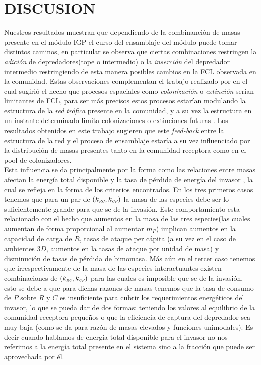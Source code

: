 \section{DISCUSION}

Nuestros resultados muestran que dependiendo de la combinanci\'on de masas presente en el m\'odulo IGP el curso del ensamblaje del m\'odulo puede tomar distintos caminos, en particular se observa que ciertas combinaciones restringen la \emph{adici\'on} de depredadores(tope o intermedio) o la \emph{inserci\'on} del depredador intermedio restringiendo de esta manera posibles cambios en la FCL observada en la comunidad\citep{TP2007proximate}. Estas observaciones complementan el trabajo realizado por \citet{holt2002food} en el cual sugiri\'o el hecho que procesos espaciales como \emph{colonizaci\'on} o \emph{extinci\'on} ser\'ian limitantes de FCL, para ser m\'as precisos estos procesos estar\'ian modulando la estructura de la \emph{red tr\'ofica} presente en la comunidad, y a su vez la estructura en un instante determinado limita colonizaciones o extinciones futuras \citep{pawar2009community,holt2002food}.  Los resultados obtenidos en este trabajo sugieren que este \emph{feed-back} entre la estructura de la red y el proceso de ensamblaje estar\'ia a su vez influenciado por la distribuci\'on de masas presentes tanto en la comunidad receptora como en el pool de colonizadores.\\

Esta influencia se da principalmente por la forma como las relaciones entre masas afectan la energ\'ia total disponible y la tasa de p\'erdida de energ\'ia del invasor \citep{pawar2012dimensionality}, la cual se refleja en la forma de los criterios encontrados. En los tres primeros casos tenemos que para un par de $(k_{\textit{\tiny RC}},k_{\textit{\tiny CP}})$ la masa de las especies debe ser lo suficientemente grande para que se de la invasi\'on. Este comportamiento esta relacionado con el hecho que aumentos en la masa de las tres especies(las cuales aumentan de forma proporcional al aumentar $m_P$) implican aumentos en la capacidad de carga de $R$, tasas de ataque per c\'apita (a su vez en el caso de ambientes $3D$, aumentos en la tasas de ataque por unidad de masa) y disminuci\'on de tasas de p\'erdida de bimomasa. M\'as a\'un en el tercer caso tenemos que irrespectivamente de la masa de las especies interactuantes existen combinaciones de $(k_{\textit{\tiny RC}},k_{\textit{\tiny CP}})$ para las cuales es imposible que se de la invasi\'on, esto se debe a que para dichas razones de masas tenemos que la tasa de consumo de $P$ sobre $R$ y $C$ es insuficiente para cubrir los requerimientos energ\'eticos del invasor, lo que se pueda dar de dos formas: teniendo los valores al equilibrio de la comunidad receptora peque\~nos o que la eficiencia de captura del depredador sea muy baja (como se da para raz\'on de masas elevados y funciones unimodales). Es decir cuando hablamos de energ\'ia total disponible para el invasor no nos referimos a la energ\'ia total presente en el sistema sino a la fracci\'on que puede ser aprovechada por \'el.\\

